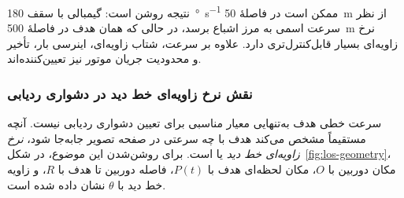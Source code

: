 \documentclass[12pt,a4paper]{article}
\begin{document}
نتیجه روشن است: گیمبالی با سقف \SI{180}{\degree\per\second} ممکن است در فاصلهٔ \SI{50}{\meter} از نظر سرعت اسمی به مرز اشباع برسد، در حالی که همان هدف در فاصلهٔ \SI{500}{\meter} نرخ زاویه‌ای بسیار قابل‌کنترل‌تری دارد. علاوه بر سرعت، شتاب زاویه‌ای، اینرسی بار، تأخیر و محدودیت جریان موتور نیز تعیین‌کننده‌اند.








\subsubsection{نقش نرخ زاویه‌ای خط دید در دشواری ردیابی}
\label{subsubsec:los-angular-rate}

سرعت خطی هدف به‌تنهایی معیار مناسبی برای تعیین دشواری ردیابی نیست.
آنچه مستقیماً مشخص می‌کند هدف با چه سرعتی در صفحه تصویر جابه‌جا شود،
\emph{نرخ زاویه‌ای خط دید}
یا
است. برای روشن‌شدن این موضوع، در
شکل~\ref{fig:los-geometry}،
مکان دوربین با \(O\)، مکان لحظه‌ای هدف با \(P(t)\)، فاصله دوربین
تا هدف با \(R\)، و زاویه خط دید با \(\theta\) نشان داده شده است.
\end{document}
